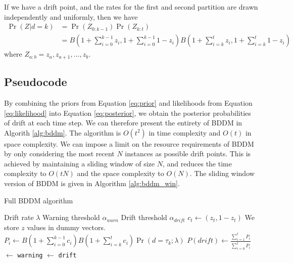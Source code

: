 If we have a drift point, and the rates for the first and second partition are drawn independently and uniformly, then we have
\begin{align}
  \Pr(Z|d=k) &= \Pr(Z_{0:k-1})\Pr(Z_{k:t}) \\
  &= B\left(1+\sum_{i=0}^{k-1} z_i,1+\sum_{i=0}^{k-1} 1-z_i\right) B\left(1+\sum_{i=k}^t z_i,1+\sum_{i=k}^t 1-z_i\right) \label{eq:likelihood}
\end{align}
where $Z_{a:b}=z_a,z_{a+1},\dots,z_b$.

\subsection{Pseudocode}

By combining the priors from Equation \ref{eq:prior} and likelihoods from Equation \ref{eq:likelihood} into Equation \ref{eq:posterior}, we obtain the posterior probabilities of drift at each time step. We can therefore present the entirety of BDDM in Algorith \ref{alg:bddm}. The algorithm is $O(t^2)$ in time complexity and $O(t)$ in space complexity. We can impose a limit on the resource requirements of BDDM by only considering the most recent $N$ instances as possible drift points. This is achieved by maintaining a sliding window of size $N$, and reduces the time complexity to $O(tN)$ and the space complexity to $O(N)$. The sliding window version of BDDM is given in Algorithm \ref{alg:bddm_win}.

\begin{algorithm}
    \caption{Full BDDM algorithm}
    \label{alg:bddm}
    \begin{algorithmic}
        \Require Drift rate $\lambda$
        \Require Warning threshold $\alpha_{warn}$
        \Require Drift threshold $\alpha_{drift}$
          \State $c_t \gets (z_t, 1-z_t)$
          \Comment We store $z$ values in dummy vectors.
            \State $P_i \gets B\left(1+\sum_{i=0}^{k-1}c_i\right) B\left(1+\sum_{i=k}^t c_i\right) \Pr(d=\tau_k;\lambda)$
          \EndFor
          \State $P(drift) \gets \frac{\sum_{i=1}^t P_i}{\sum_{i=0}^t P_i}$
             $\gets$ {\tt warning}
             $\gets$ {\tt drift}
          \EndIf
        \EndFor
    \end{algorithmic}
\end{algorithm}

